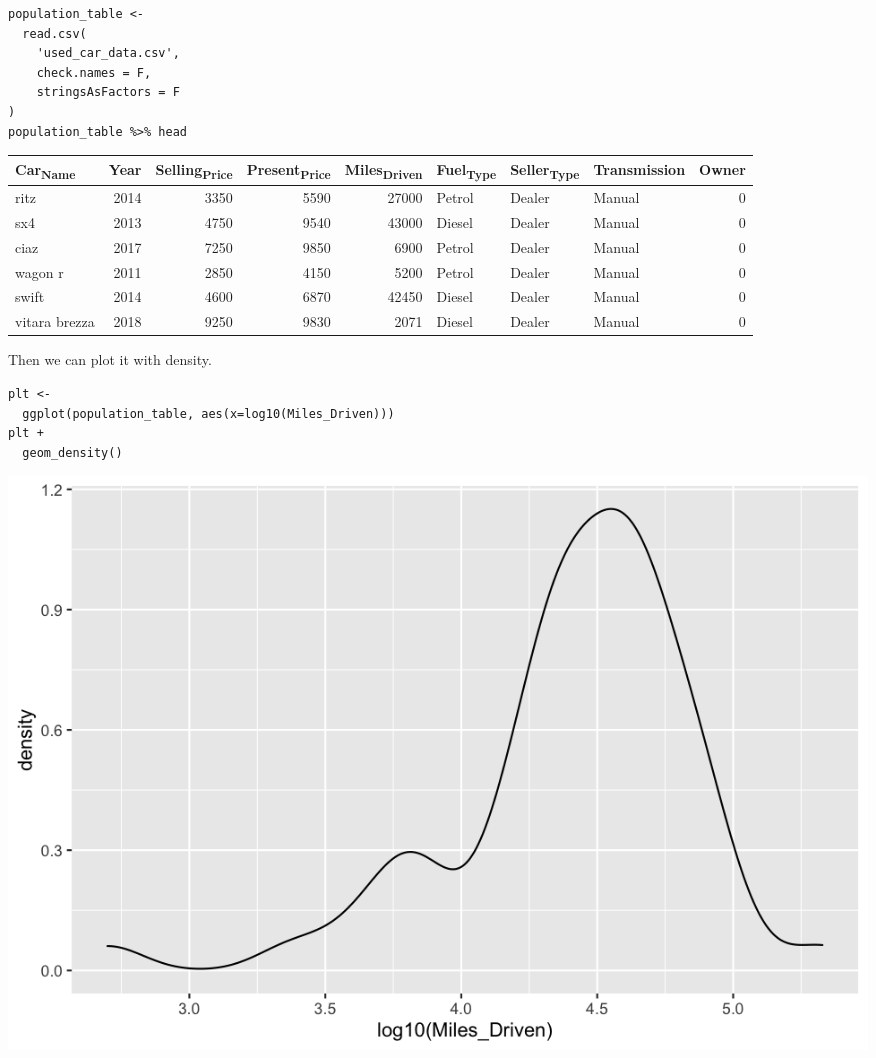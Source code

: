 \documentclass[11pt]{article}
\begin{document}
\begin{verbatim}
population_table <-
  read.csv(
    'used_car_data.csv',
    check.names = F,
    stringsAsFactors = F
)
population_table %>% head
\end{verbatim}

\begin{org}
\begin{center}
\begin{tabular}{lrrrrlllr}
Car\textsubscript{Name} & Year & Selling\textsubscript{Price} & Present\textsubscript{Price} & Miles\textsubscript{Driven} & Fuel\textsubscript{Type} & Seller\textsubscript{Type} & Transmission & Owner\\
\hline
ritz & 2014 & 3350 & 5590 & 27000 & Petrol & Dealer & Manual & 0\\
sx4 & 2013 & 4750 & 9540 & 43000 & Diesel & Dealer & Manual & 0\\
ciaz & 2017 & 7250 & 9850 & 6900 & Petrol & Dealer & Manual & 0\\
wagon r & 2011 & 2850 & 4150 & 5200 & Petrol & Dealer & Manual & 0\\
swift & 2014 & 4600 & 6870 & 42450 & Diesel & Dealer & Manual & 0\\
vitara brezza & 2018 & 9250 & 9830 & 2071 & Diesel & Dealer & Manual & 0\\
\end{tabular}
\end{center}
\end{org}

Then we can plot it with density.

\begin{verbatim}
plt <-
  ggplot(population_table, aes(x=log10(Miles_Driven)))
plt +
  geom_density()
\end{verbatim}

\begin{org}
\begin{center}
\includegraphics[width=.9\linewidth]{./resources/used_car_density.png}
\end{center}
\end{org}
\end{document}
